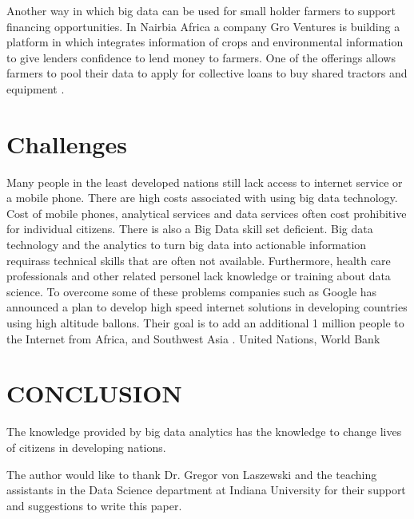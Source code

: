 \documentclass[sigconf]{acmart}
\begin{document}
Another way in which big data can be used for small holder farmers to support financing opportunities. In Nairbia Africa a company Gro Ventures is building a platform in which integrates information of crops and environmental information to give lenders confidence to lend money to farmers. One of the offerings allows farmers to pool their data to apply for collective loans to buy shared tractors and equipment \cite{www-google-Hffpst}.   

\section{Challenges}
Many people in the least developed nations still lack access to internet service or a mobile phone. There are high costs associated with using big data technology. Cost of mobile phones, analytical services and data services often cost prohibitive for individual citizens. There is also a Big Data skill set deficient. Big data technology and the analytics to turn big data into actionable information requirass technical skills that are often not available. Furthermore, health care professionals and other related personel lack knowledge or training about data science. 
To overcome some of these problems companies such as Google has announced a plan to develop high speed internet solutions in developing countries using high altitude ballons. Their goal is to add an additional 1 million people to the Internet from Africa,  and Southwest Asia \cite{DevEcon}. 
United Nations, World Bank	




 





\section{CONCLUSION}

The knowledge provided by big data analytics has the knowledge to change lives of citizens in developing nations.







\begin{acks}

  The author would like to thank Dr. Gregor von Laszewski and the teaching assistants in the Data Science department at Indiana  University for their support and suggestions to write this paper.

\end{acks}




 
\end{document}
